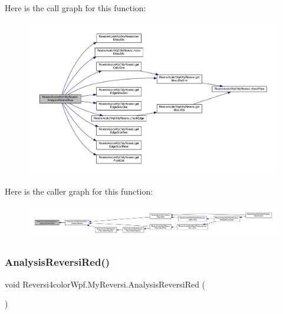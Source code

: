 Here is the call graph for this function\+:
\nopagebreak
\begin{figure}[H]
\begin{center}
\leavevmode
\includegraphics[width=350pt]{class_reversi4color_wpf_1_1_my_reversi_a4acbdc2f3b8873eb4e5e0858eb4cfc75_cgraph}
\end{center}
\end{figure}
Here is the caller graph for this function\+:
\nopagebreak
\begin{figure}[H]
\begin{center}
\leavevmode
\includegraphics[width=350pt]{class_reversi4color_wpf_1_1_my_reversi_a4acbdc2f3b8873eb4e5e0858eb4cfc75_icgraph}
\end{center}
\end{figure}
\mbox{\label{class_reversi4color_wpf_1_1_my_reversi_afb6eb8a1ecd5bb4498425bea6103f261}} 
\subsubsection{\texorpdfstring{Analysis\+Reversi\+Red()}{AnalysisReversiRed()}}
{\footnotesize\ttfamily void Reversi4color\+Wpf.\+My\+Reversi.\+Analysis\+Reversi\+Red (\begin{DoxyParamCaption}{ }\end{DoxyParamCaption})\hspace{0.3cm}{\ttfamily [private]}}



